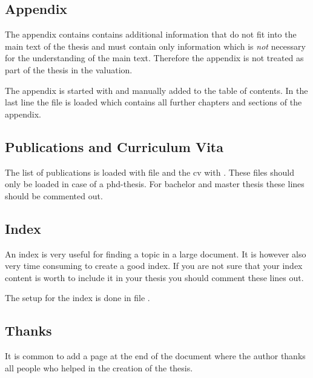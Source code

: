
\subsection{Appendix}
The appendix contains contains additional information that do not fit into the main text of the thesis and must contain only information which is \emph{not} necessary for the understanding of the main text. Therefore the appendix is not treated as part of the thesis in the valuation.

The appendix is started with  and manually added to the table of contents. In the last line the file  is loaded which contains all further chapters and sections of the appendix.
%

\subsection{Publications and Curriculum Vita}
The list of publications is loaded with file  and the cv with . These files should only be loaded in case of a phd-thesis. For bachelor and master thesis these lines should be commented out.
%

\subsection{Index}
An index is very useful for finding a topic in a large document. It is however also very time consuming to create a good index. If you are not sure that your index content is worth to include it in your thesis you should comment these lines out.

The setup for the index is done in file .

\subsection{Thanks}
It is common to add a page at the end of the document where the author thanks all people who helped in the creation of the thesis. 

